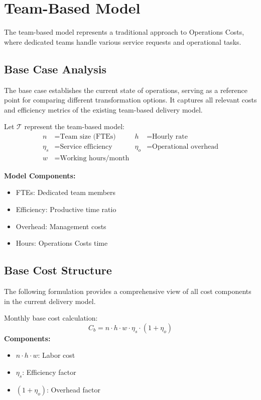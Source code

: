 \documentclass[12pt,a4paper]{article}
\newenvironment{definition}[1]
{\begin{mdframed}[style=definitionstyle,frametitle={Definition: #1}]}
{\end{mdframed}}
\newenvironment{explanation}
{\begin{mdframed}[style=explanationstyle,frametitle={Explanation}]}
{\end{mdframed}}
\begin{document}
\section{Team-Based Model}
The team-based model represents a traditional approach to Operations Costs, where dedicated teams handle various service requests and operational tasks.

\subsection{Base Case Analysis}
The base case establishes the current state of operations, serving as a reference point for comparing different transformation options. It captures all relevant costs and efficiency metrics of the existing team-based delivery model.

\begin{definition}{Team Model Variables}
Let $\mathcal{T}$ represent the team-based model:
\begin{align*}
    n &= \text{Team size (FTEs)} & h &= \text{Hourly rate} \\
    \eta_s &= \text{Service efficiency} & \eta_o &= \text{Operational overhead} \\
    w &= \text{Working hours/month} & &
\end{align*}
\end{definition}

\begin{explanation}
\textbf{Model Components:}
\begin{itemize}
    \item FTEs: Dedicated team members
    \item Efficiency: Productive time ratio
    \item Overhead: Management costs
    \item Hours: Operations Costs time
\end{itemize}
\end{explanation}

\subsection{Base Cost Structure}
The following formulation provides a comprehensive view of all cost components in the current delivery model.

\begin{definition}{Base Team Cost}
Monthly base cost calculation:
\begin{equation}
    C_b = n \cdot h \cdot w \cdot \eta_s \cdot (1 + \eta_o)
\end{equation}
\textbf{Components:}
\begin{itemize}
    \item $n \cdot h \cdot w$: Labor cost
    \item $\eta_s$: Efficiency factor
    \item $(1 + \eta_o)$: Overhead factor
\end{itemize}
\end{definition}
\end{document}
